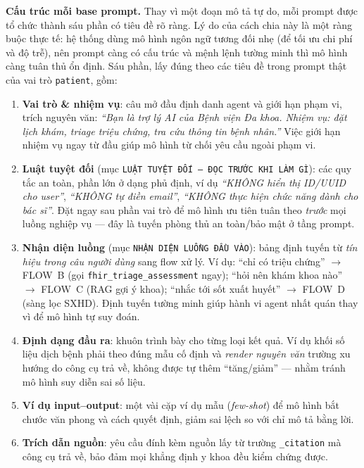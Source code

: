\documentclass[a4paper,13pt,3p,oneside]{report}
\theoremstyle{definition}
\theoremstyle{remark}
\theoremstyle{definition}
\begin{document}
\textbf{Cấu trúc mỗi base prompt.} Thay vì một đoạn mô tả tự do, mỗi prompt được tổ chức thành sáu phần có tiêu đề rõ ràng. Lý do của cách chia này là một ràng buộc thực tế: hệ thống dùng mô hình ngôn ngữ tương đối nhẹ (để tối ưu chi phí và độ trễ), nên prompt càng có cấu trúc và mệnh lệnh tường minh thì mô hình càng tuân thủ ổn định. Sáu phần, lấy đúng theo các tiêu đề trong prompt thật của vai trò \texttt{patient}, gồm:

\begin{enumerate}
  \item \textbf{Vai trò \& nhiệm vụ}: câu mở đầu định danh agent và giới hạn phạm vi, trích nguyên văn: \textit{``Bạn là trợ lý AI của Bệnh viện Đa khoa. Nhiệm vụ: đặt lịch khám, triage triệu chứng, tra cứu thông tin bệnh nhân.''} Việc giới hạn nhiệm vụ ngay từ đầu giúp mô hình từ chối yêu cầu ngoài phạm vi.
  \item \textbf{Luật tuyệt đối} (mục \texttt{LUẬT TUYỆT ĐỐI --- ĐỌC TRƯỚC KHI LÀM GÌ}): các quy tắc an toàn, phần lớn ở dạng phủ định, ví dụ \textit{``KHÔNG hiển thị ID/UUID cho user''}, \textit{``KHÔNG tự điền email''}, \textit{``KHÔNG thực hiện chức năng dành cho bác sĩ''}. Đặt ngay sau phần vai trò để mô hình ưu tiên tuân theo \textit{trước} mọi luồng nghiệp vụ --- đây là tuyến phòng thủ an toàn/bảo mật ở tầng prompt.
  \item \textbf{Nhận diện luồng} (mục \texttt{NHẬN DIỆN LUỒNG ĐẦU VÀO}): bảng định tuyến từ \textit{tín hiệu trong câu người dùng} sang flow xử lý. Ví dụ: ``chỉ có triệu chứng'' $\to$ FLOW~B (gọi \texttt{fhir\_triage\_assessment} ngay); ``hỏi nên khám khoa nào'' $\to$ FLOW~C (RAG gợi ý khoa); ``nhắc tới sốt xuất huyết'' $\to$ FLOW~D (sàng lọc SXHD). Định tuyến tường minh giúp hành vi agent nhất quán thay vì để mô hình tự suy đoán.
  \item \textbf{Định dạng đầu ra}: khuôn trình bày cho từng loại kết quả. Ví dụ khối số liệu dịch bệnh phải theo đúng mẫu cố định và \textit{render nguyên văn} trường xu hướng do công cụ trả về, không được tự thêm ``tăng/giảm'' --- nhằm tránh mô hình suy diễn sai số liệu.
  \item \textbf{Ví dụ input--output}: một vài cặp ví dụ mẫu (\textit{few-shot}) để mô hình bắt chước văn phong và cách quyết định, giảm sai lệch so với chỉ mô tả bằng lời.
  \item \textbf{Trích dẫn nguồn}: yêu cầu đính kèm nguồn lấy từ trường \texttt{\_citation} mà công cụ trả về, bảo đảm mọi khẳng định y khoa đều kiểm chứng được.
\end{enumerate}
\end{document}
